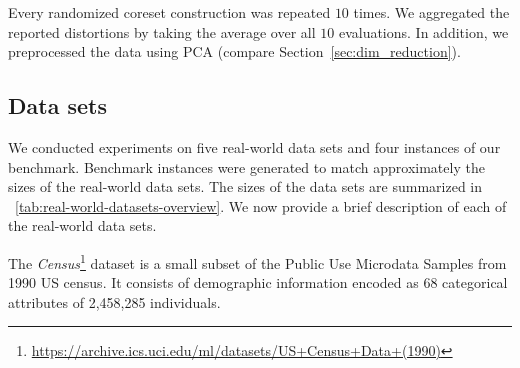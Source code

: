 Every randomized coreset construction was repeated $10$ times. We aggregated the reported distortions by taking the average over all $10$ evaluations. 
In addition, we preprocessed the data using PCA (compare Section~\ref{sec:dim_reduction}).





\subsection{Data sets}
We conducted experiments on five real-world data sets and four instances of our benchmark. Benchmark instances were generated to match approximately the sizes of the real-world data sets. The sizes of the data sets are summarized in ~\cref{tab:real-world-datasets-overview}. 
We now provide a brief description of each of the real-world data sets.

The \textit{Census}\footnote{\url{https://archive.ics.uci.edu/ml/datasets/US+Census+Data+(1990)}} dataset is a small subset of the Public Use Microdata Samples from 1990 US census. It consists of demographic information encoded as 68 categorical attributes of 2,458,285 individuals. 

